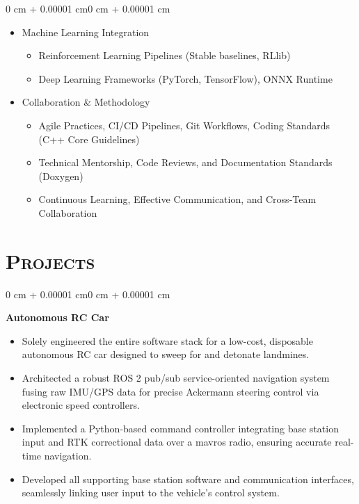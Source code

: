 \documentclass[10pt, letterpaper]{article}
\newenvironment{highlights}{
    \begin{itemize}[
        topsep=0.10 cm,
        parsep=0.10 cm,
        partopsep=0pt,
        itemsep=0pt,
        leftmargin=0.4 cm + 10pt
    ]
}{
    \end{itemize}
}
\newenvironment{onecolentry}{
    \begin{adjustwidth}{0 cm + 0.00001 cm}{0 cm + 0.00001 cm}
}{
    \end{adjustwidth}
}
\begin{document}
\begin{onecolentry}
\begin{highlights}
        \item Machine Learning Integration
        \begin{itemize}
            \item Reinforcement Learning Pipelines (Stable baselines, RLlib)
            \item Deep Learning Frameworks (PyTorch, TensorFlow), ONNX Runtime
        \end{itemize}

        \item Collaboration \& Methodology
        \begin{itemize}
            \item Agile Practices, CI/CD Pipelines, Git Workflows, Coding Standards (C++ Core Guidelines)
            \item Technical Mentorship, Code Reviews, and Documentation Standards (Doxygen)
            \item Continuous Learning, Effective Communication, and Cross-Team Collaboration
        \end{itemize}
    \end{highlights}
\end{onecolentry}


\section{\scshape Projects}

\vspace{0.2 cm}

\begin{onecolentry}
    \textbf{Autonomous RC Car}
    \begin{highlights}
        \item Solely engineered the entire software stack for a low-cost, disposable autonomous RC car designed to sweep for and detonate landmines.
        \item Architected a robust ROS 2 pub/sub service-oriented navigation system fusing raw IMU/GPS data for precise Ackermann steering control via electronic speed controllers.
        \item Implemented a Python-based command controller integrating base station input and RTK correctional data over a mavros radio, ensuring accurate real-time navigation.
        \item Developed all supporting base station software and communication interfaces, seamlessly linking user input to the vehicle’s control system.
    \end{highlights}
\end{onecolentry}
\end{document}
